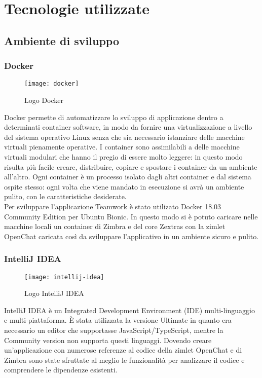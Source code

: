 
\chapter{Tecnologie utilizzate}\label{chap:tec}
\section{Ambiente di sviluppo}
\subsection{Docker}
	\begin{figure}[H] 
		\centering
		\texttt{[image: docker]}
		\caption{Logo Docker}
	\end{figure}
Docker permette di automatizzare lo sviluppo di applicazione dentro a 
determinati container software, 
in modo da fornire una virtualizzazione a livello del sistema operativo Linux
senza che sia necessario istanziare delle macchine virtuali pienamente 
operative.
I container sono assimilabili a delle macchine virtuali modulari che hanno il 
pregio di essere molto 
leggere: in questo modo risulta più facile  creare, distribuire, copiare e spostare 
i container da un 
ambiente all'altro.
Ogni container è un processo isolato dagli altri container e dal sistema ospite stesso:  ogni volta che 
viene mandato in esecuzione si avrà un ambiente pulito, con le caratteristiche desiderate. \\
Per sviluppare l'applicazione Teamwork è stato utilizato Docker 18.03 Community Edition per Ubuntu 
Bionic. In questo modo si è potuto caricare nelle macchine locali un container di Zimbra e del core 
Zextras con la zimlet OpenChat caricata così da sviluppare l'applicativo in un ambiente sicuro e pulito.

\subsection{IntelliJ IDEA} \label{subsec:IntelliJ}
	\begin{figure}[H] 
		\centering
		\texttt{[image: intellij-idea]}
		\caption{Logo IntelliJ IDEA}
	\end{figure}
IntelliJ IDEA è un Integrated Development Environment (IDE) multi-linguaggio e 
multi-piattaforma. 
È stata utilizzata la versione Ultimate in quanto era necessario un editor che 
supportasse  
JavaScript/TypeScript, mentre la Community version non supporta questi 
linguaggi. 
Dovendo creare un'applicazione con numerose referenze al codice della zimlet 
OpenChat e di Zimbra 
sono state sfruttate al meglio le funzionalità per analizzare il codice e 
comprendere le 
dipendenze esistenti.

